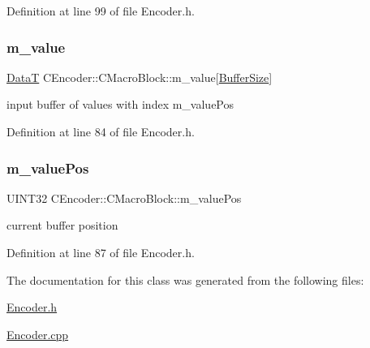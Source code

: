 Definition at line 99 of file Encoder.\+h.

\mbox{\label{classCEncoder_1_1CMacroBlock_a139b60f3f0d76b9158573e4d897423d6}} 
\subsubsection{\texorpdfstring{m\_value}{m\_value}}
{\footnotesize\ttfamily \mbox{\hyperlink{PGFtypes_8h_acb1ee3f52ccfad782dcaa0abd79e5d05}{DataT}} C\+Encoder\+::\+C\+Macro\+Block\+::m\+\_\+value\mbox{[}\mbox{\hyperlink{PGFtypes_8h_aa362edf6db9662acf6ef958a6db19c35}{Buffer\+Size}}\mbox{]}}



input buffer of values with index m\+\_\+value\+Pos 



Definition at line 84 of file Encoder.\+h.

\mbox{\label{classCEncoder_1_1CMacroBlock_a7ab47e29ad9e3397869fdfb50b53e035}} 
\subsubsection{\texorpdfstring{m\_valuePos}{m\_valuePos}}
{\footnotesize\ttfamily U\+I\+N\+T32 C\+Encoder\+::\+C\+Macro\+Block\+::m\+\_\+value\+Pos}



current buffer position 



Definition at line 87 of file Encoder.\+h.



The documentation for this class was generated from the following files\+:\begin{DoxyCompactItemize}
\item 
\mbox{\hyperlink{Encoder_8h}{Encoder.\+h}}\item 
\mbox{\hyperlink{Encoder_8cpp}{Encoder.\+cpp}}\end{DoxyCompactItemize}
